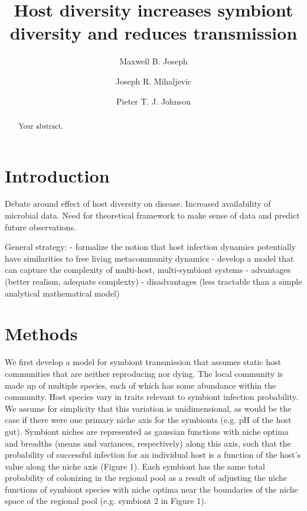 \documentclass[12pt]{article}
\title{Host diversity increases symbiont diversity and reduces transmission}
\author[1]{Maxwell B. Joseph}
\author[2]{Joseph R. Mihaljevic}
\author[1]{Pieter T. J. Johnson}
\affil[1]{Ecology and Evolutionary Biology, University of Colorado, Boulder}
\affil[2]{Ecology and Evolution, University of Chicago}
\date{}
\begin{document}
\maketitle

\begin{abstract}
Your abstract.
\end{abstract}

\section{Introduction}

Debate around effect of host diversity on disease. 
Increased availability of microbial data. 
Need for theoretical framework to make sense of data and predict future observations.

General strategy: 
- formalize the notion that host infection dynamics potentially have similarities to free living metacommunity dynamics
- develop a model that can capture the complexity of multi-host, multi-symbiont systems
- advantages (better realism, adequate complexty)
- disadvantages (less tractable than a simple analytical mathematical model)

\section{Methods}

We first develop a model for symbiont transmission that assumes static host communities that are neither reproducing nor dying. 
The local community is made up of multiple species, each of which has some abundance within the community. 
Host species vary in traits relevant to symbiont infection probability. 
We assume for simplicity that this variation is unidimensional, as would be the case if there were one primary niche axis for the symbionts (e.g. pH of the host gut). 
Symbiont niches are represented as gaussian functions with niche optima and breadths (means and variances, respectively) along this axis, such that the probability of successful infection for an individual host is a function of the host's value along the niche axis (Figure 1). 
Each symbiont has the same total probability of colonizing in the regional pool as a result of adjusting the niche functions of symbiont species with niche optima near the boundaries of  the niche space of the regional pool (e.g. symbiont 2 in Figure 1).
\end{document}
